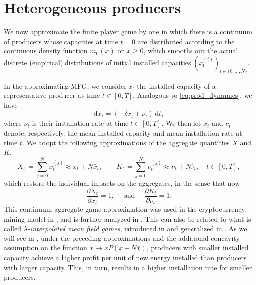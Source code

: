 \documentclass[12pt]{article}
\def\drm{\mathrm{d}}
\def\Nu{K}
\begin{document}
\section{Heterogeneous producers}\label{sec:heterogeneous}
We now approximate the finite player game by one in which there is a continuum of producers whose capacities at time $t=0$ are distributed according to the continuous density function $m_0(x)$ on $x\geq0$, which smooths out the actual discrete (empirical) distributions of initial installed capacities $(x^{(i)}_0)_{i \in \{0,\dots,N\}}$. 

In the approximating MFG, we consider $x_t$ the installed capacity of a representative producer at time $t \in [0,T]$. 
Analogous to \eqref{eq:prod_dynamics}, we have 
\begin{equation}\label{eq:dynamic_x_heterogeneous}
    \drm x^{}_t=(-\delta x^{}_t+\nu^{}_t)\,  \drm t,
\end{equation}
where $\nu_t$ is their installation rate at time $t \in [0,T]$. 
We then let $\bar{x}_t$ and $\bar{\nu}_t$ denote, respectively, the mean installed capacity and mean installation rate at time $t$. 
We adopt the following approximations of the aggregate quantities $X$ and $\Nu$,
\begin{equation}\label{eq:approx_aggregate}
X_t \coloneq \sum_{j=0}^{N}x^{(j)}_t\approx x_t+N\bar{x}_t,\qquad
\Nu_t \coloneq \sum_{j=0}^{N}{\nu}^{(j)}_t\approx {\nu}_t+N{\bar{\nu}_t}, \quad t \in [0,T],
\end{equation}
which restore the individual impacts on the aggregates, in the sense that now
$$\frac{\partial X_t}{\partial x_t} = 1, \quad \text{ and } \quad \frac{\partial \Nu_t}{\partial \nu_t} = 1.$$
This continuum aggregate game approximation was used in the cryptocurrency-mining model in \cite{li2024mean}, and is further analyzed in \cite{cags}. This can also be related to what is called \emph{$\lambda$-interpolated mean field games}, introduced in \cite{carmona2023nash} and generalized in \cite{dayanikli2025cooperation}. As we will see in , under the preceding approximations and the additional concavity assumption on the function $x \longmapsto xP(x+N\bar{x})$, producers with smaller installed capacity achieve a higher profit per unit of new energy installed than producers with larger capacity. This, in turn, results in a higher installation rate for smaller producers.
\end{document}
